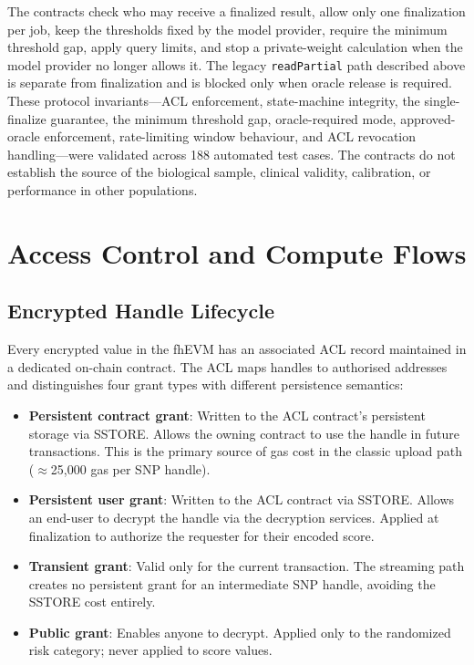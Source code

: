 \documentclass[10pt]{article}
\begin{document}
The contracts check who may receive a finalized result, allow only one finalization per job,
keep the thresholds fixed by the model provider, require the minimum threshold gap,
apply query limits, and stop a private-weight calculation when the model provider no
longer allows it.  The legacy \texttt{readPartial} path described above is separate from
finalization and is blocked only when oracle release is required.  These protocol
invariants---ACL enforcement, state-machine integrity, the single-finalize guarantee,
the minimum threshold gap, oracle-required mode, approved-oracle enforcement,
rate-limiting window behaviour, and ACL revocation handling---were validated across 188
automated test cases.  The contracts do not establish the
source of the biological sample, clinical validity, calibration, or performance in
other populations.

\section{Access Control and Compute Flows}
\label{sec:acl}

\subsection{Encrypted Handle Lifecycle}

Every encrypted value in the fhEVM has an associated ACL record maintained in a
dedicated on-chain contract.  The ACL maps handles to authorised addresses and
distinguishes four grant types with different persistence semantics:

\begin{itemize}
  \item \textbf{Persistent contract grant}: Written to the ACL contract's persistent
        storage via SSTORE.  Allows the owning contract to use the handle in future
        transactions.  This is the primary source of gas cost in the classic upload
        path ($\approx$25,000 gas per SNP handle).
  \item \textbf{Persistent user grant}: Written to the ACL contract via SSTORE.
        Allows an end-user to decrypt the handle via the decryption services.  Applied
        at finalization to authorize the requester for their encoded score.
  \item \textbf{Transient grant}: Valid only for the current transaction.  The streaming
        path creates no persistent grant for an intermediate SNP handle, avoiding the
        SSTORE cost entirely.
  \item \textbf{Public grant}: Enables anyone to decrypt.  Applied only to the
        randomized risk category; never applied to score values.
\end{itemize}
\end{document}
